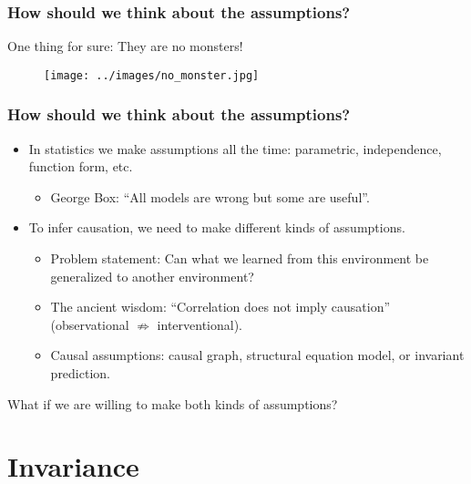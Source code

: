 \documentclass{beamer}
\begin{document}
\begin{frame}
  \frametitle{How should we think about the assumptions?}
  \begin{center}
    One thing for sure: They are no monsters!
  \end{center}
  \vspace{12em}
  \begin{figure}
    \centering
    \texttt{[image: ../images/no\_monster.jpg]}
  \end{figure}

\end{frame}

\begin{frame}
  \frametitle{How should we think about the assumptions?}
  \begin{itemize}
  \item In statistics we make assumptions all the
    time: parametric, independence, function form, etc.
    \begin{itemize}
    \item George Box: ``All models are wrong but some are useful''.
    \end{itemize}
  \item To infer causation, we need to make different kinds of
    assumptions.
    \begin{itemize}
    \item Problem statement: Can what we learned from this environment
      be generalized to another environment?
    \item The ancient wisdom: ``Correlation does not imply
      causation'' (observational $\not \Rightarrow$ interventional).
    \item Causal assumptions: causal graph, structural equation model,
      or invariant prediction.
    \end{itemize}
  \end{itemize}

  \begin{center}
    What if we are willing to make both kinds of assumptions?
  \end{center}
\end{frame}

\section{Invariance}

\begin{frame}
  \sectionpage
\end{frame}
\end{document}
